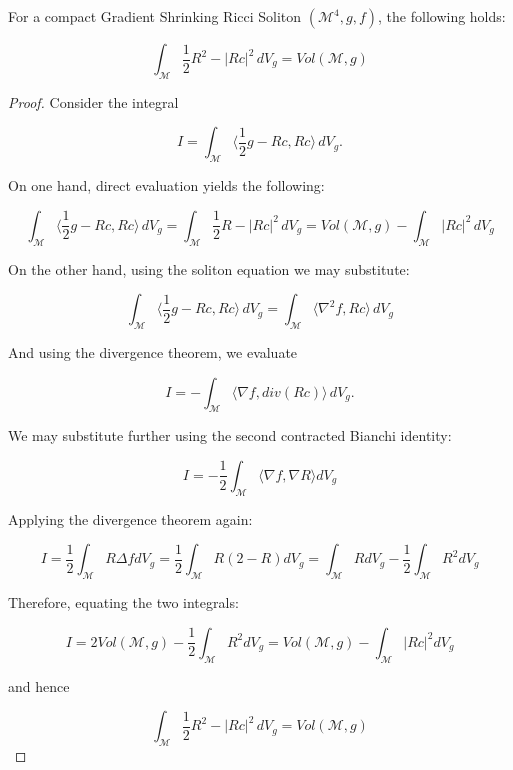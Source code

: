 \documentclass[10pt,a4paper]{amsart}
\begin{document}
\begin{lem}
    For a compact Gradient Shrinking Ricci Soliton $(\mathcal{M}^4, g, f)$, the following holds:

    $$\int_{\mathcal{M}} \frac{1}{2} R^2 - |Rc|^2 \,dV_g = Vol(\mathcal{M}, g) $$
\end{lem}

\begin{proof}
Consider the integral

$$ I = \int_{\mathcal{M}} \langle \frac{1}{2}g - Rc, Rc \rangle \,dV_g.$$

On one hand, direct evaluation yields the following:

$$\int_{\mathcal{M}} \langle \frac{1}{2}g - Rc, Rc \rangle \,dV_g = 
 \int_{\mathcal{M}} \frac{1}{2}R - |Rc|^2 \,dV_g = 
 Vol(\mathcal{M}, g) - \int_{\mathcal{M}} |Rc|^2  \,dV_g$$

On the other hand, using the soliton equation we may substitute:

$$\int_{\mathcal{M}} \langle \frac{1}{2}g - Rc, Rc \rangle \,dV_g = 
\int_{\mathcal{M}} \langle \nabla ^2 f, Rc \rangle \,dV_g$$

And using the divergence theorem, we evaluate 

$$I = - \int_{\mathcal{M}} \langle \nabla f, div(Rc) \rangle \,dV_g.$$

We may substitute further using the second contracted Bianchi identity:

$$I = - \frac{1}{2} \int_{\mathcal{M}} \langle \nabla f, \nabla R \rangle dV_g$$

Applying the divergence theorem again:

$$I = \frac{1}{2}\int_{\mathcal{M}} R \Delta f dV_g= \frac{1}{2}\int_{\mathcal{M}} R(2 - R) dV_g = \int_{\mathcal{M}} R dV_g - \frac{1}{2}\int_{\mathcal{M}} R^2 dV_g$$

Therefore, equating the two integrals:

$$I = 2Vol(\mathcal{M}, g) - \frac{1}{2}\int_{\mathcal{M}} R^2 dV_g = Vol(\mathcal{M}, g) - \int_{\mathcal{M}} |Rc|^2 dV_g$$

and hence 

 $$\int_{\mathcal{M}} \frac{1}{2} R^2 - |Rc|^2 \,dV_g = Vol(\mathcal{M}, g) $$

\end{proof}
\end{document}
